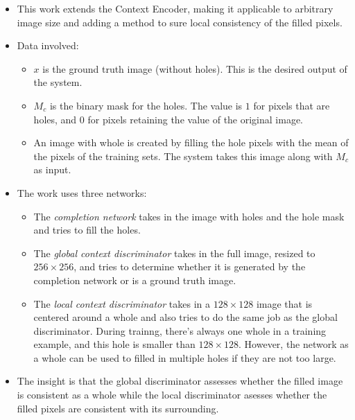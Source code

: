 \documentclass[10pt]{article}
\begin{document}
  \begin{itemize}
  	\item This work extends the Context Encoder, making it applicable to arbitrary image size and adding a method to sure local consistency of the filled pixels.

  	\item Data involved:
  	\begin{itemize}
  		\item $x$ is the ground truth image (without holes). This is the desired output of the system.

  		\item $M_c$ is the binary mask for the holes. The value is $1$ for pixels that are holes, and $0$ for pixels retaining the value of the original image.

  		\item An image with whole is created by filling the hole pixels with the mean of the pixels of the training sets. The system takes this image along with $M_c$ as input.  		
  	\end{itemize}

  	\item The work uses three networks:
  	\begin{itemize}
  		\item The \emph{completion network} takes in the image with holes and the hole mask and tries to fill the holes.

  		\item The \emph{global context discriminator} takes in the full image, resized to $256 \times 256$, and tries to determine whether it is generated by the completion network or is a ground truth image.

  		\item The \emph{local context discriminator} takes in a $128 \times 128$ image that is centered around a whole and also tries to do the same job as the global discriminator. During trainng, there's always one whole in a training example, and this hole is smaller than $128 \times 128$. However, the network as a whole can be used to filled in multiple holes if they are not too large.
  	\end{itemize}

  	\item The insight is that the global discriminator assesses whether the filled image is consistent as a whole while the local discriminator asesses whether the filled pixels are consistent with its surrounding.  	
  \end{itemize}
\end{document}
